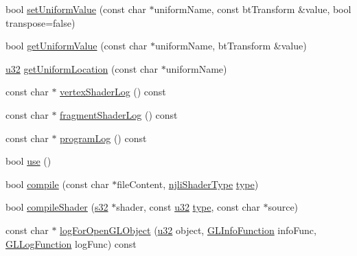 \begin{DoxyCompactItemize}
\item 
bool \mbox{\hyperlink{classnjli_1_1_shader_program_ab55e9cbbf6a0921259a38c50ff0c6c80}{set\+Uniform\+Value}} (const char $\ast$uniform\+Name, const bt\+Transform \&value, bool transpose=false)
\item 
bool \mbox{\hyperlink{classnjli_1_1_shader_program_a3a27d20080728fd333fb013f6492ee34}{get\+Uniform\+Value}} (const char $\ast$uniform\+Name, bt\+Transform \&value)
\item 
\mbox{\hyperlink{_util_8h_a10e94b422ef0c20dcdec20d31a1f5049}{u32}} \mbox{\hyperlink{classnjli_1_1_shader_program_aa870b331b82002024be451a7d556d99c}{get\+Uniform\+Location}} (const char $\ast$uniform\+Name)
\item 
const char $\ast$ \mbox{\hyperlink{classnjli_1_1_shader_program_a132663261df4c7029260a59afb91a19d}{vertex\+Shader\+Log}} () const
\item 
const char $\ast$ \mbox{\hyperlink{classnjli_1_1_shader_program_a3f4444c90822c63fee69261f476774b7}{fragment\+Shader\+Log}} () const
\item 
const char $\ast$ \mbox{\hyperlink{classnjli_1_1_shader_program_a28dfbce737ee0481f6a8199a0b1b226f}{program\+Log}} () const
\item 
bool \mbox{\hyperlink{classnjli_1_1_shader_program_a1295b3e2656bc24f485dc97a7d920b67}{use}} ()
\item 
bool \mbox{\hyperlink{classnjli_1_1_shader_program_a5a6c623a0321cfc305b6edc6e514b049}{compile}} (const char $\ast$file\+Content, \mbox{\hyperlink{namespacenjli_a8f2b6cfac9213576c34bcf711ac39fbd}{njli\+Shader\+Type}} \mbox{\hyperlink{classnjli_1_1_shader_program_a92e24de59f2e44318baab955895910ba}{type}})
\item 
bool \mbox{\hyperlink{classnjli_1_1_shader_program_a47e7e27178632533e9d8c805f5482812}{compile\+Shader}} (\mbox{\hyperlink{_util_8h_aa62c75d314a0d1f37f79c4b73b2292e2}{s32}} $\ast$shader, const \mbox{\hyperlink{_util_8h_a10e94b422ef0c20dcdec20d31a1f5049}{u32}} \mbox{\hyperlink{classnjli_1_1_shader_program_a92e24de59f2e44318baab955895910ba}{type}}, const char $\ast$source)
\item 
const char $\ast$ \mbox{\hyperlink{classnjli_1_1_shader_program_a73023771e5e565e69571188ebc59a471}{log\+For\+Open\+G\+L\+Object}} (\mbox{\hyperlink{_util_8h_a10e94b422ef0c20dcdec20d31a1f5049}{u32}} object, \mbox{\hyperlink{_shader_program_8h_a50070b167d585b9e4ba6faa4e3063cc7}{G\+L\+Info\+Function}} info\+Func, \mbox{\hyperlink{_shader_program_8h_a946b6792efe50de240df436a3d028764}{G\+L\+Log\+Function}} log\+Func) const

\end{DoxyCompactItemize}
